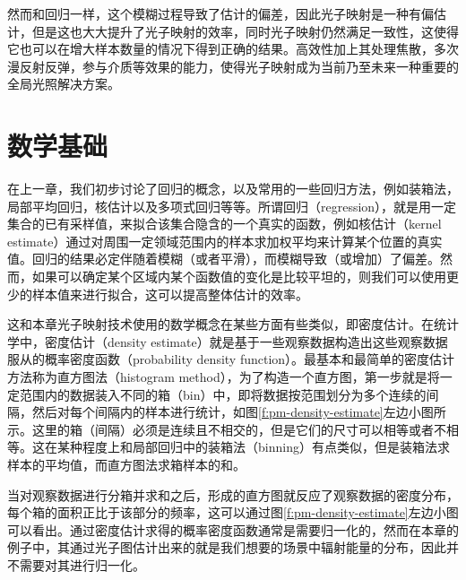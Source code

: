 然而和回归一样，这个模糊过程导致了估计的偏差，因此光子映射是一种有偏估计，但是这也大大提升了光子映射的效率，同时光子映射仍然满足一致性，这使得它也可以在增大样本数量的情况下得到正确的结果。高效性加上其处理焦散，多次漫反射反弹，参与介质等效果的能力，使得光子映射成为当前乃至未来一种重要的全局光照解决方案。





\section{数学基础}
在上一章，我们初步讨论了回归的概念，以及常用的一些回归方法，例如装箱法，局部平均回归，核估计以及多项式回归等等。所谓回归（regression），就是用一定集合的已有采样值，来拟合该集合隐含的一个真实的函数，例如核估计（kernel estimate）通过对周围一定领域范围内的样本求加权平均来计算某个位置的真实值。回归的结果必定伴随着模糊（或者平滑），而模糊导致（或增加）了偏差。然而，如果可以确定某个区域内某个函数值的变化是比较平坦的，则我们可以使用更少的样本值来进行拟合，这可以提高整体估计的效率。

这和本章光子映射技术使用的数学概念在某些方面有些类似，即密度估计。在统计学中，密度估计（density estimate）就是基于一些观察数据构造出这些观察数据服从的概率密度函数（probability density function）。最基本和最简单的密度估计方法称为直方图法（histogram method），为了构造一个直方图，第一步就是将一定范围内的数据装入不同的箱（bin）中，即将数据按范围划分为多个连续的间隔，然后对每个间隔内的样本进行统计，如图\ref{f:pm-density-estimate}左边小图所示。这里的箱（间隔）必须是连续且不相交的，但是它们的尺寸可以相等或者不相等。这在某种程度上和局部回归中的装箱法（binning）有点类似，但是装箱法求样本的平均值，而直方图法求箱样本的和。

当对观察数据进行分箱并求和之后，形成的直方图就反应了观察数据的密度分布，每个箱的面积正比于该部分的频率，这可以通过图\ref{f:pm-density-estimate}左边小图可以看出。通过密度估计求得的概率密度函数通常是需要归一化的，然而在本章的例子中，其通过光子图估计出来的就是我们想要的场景中辐射能量的分布，因此并不需要对其进行归一化。

